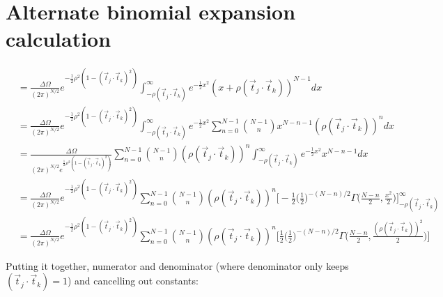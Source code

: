 \documentclass[12pt]{article}
\newcommand{\ptjtk}{\rho(\vec{t}_j\cdot\vec{t}_k)}
\newcommand{\tjtk}{(\vec{t}_j\cdot\vec{t}_k)}
\begin{document}
\section{Alternate binomial expansion calculation}\label{section:alternate_binomial_expansion_calculations}

        \begin{align}
        &= \frac{\Delta\Omega}{(2\pi)^{N/2}} e^{-\frac{1}{2}\rho^2(1-(\vec{t}_j\cdot\vec{t}_k)^2)} \int_{-\ptjtk}^\infty  e^{-\frac{1}{2} x^2  } {(x+\ptjtk)^{N-1}} dx \\
        &= \frac{\Delta\Omega}{(2\pi)^{N/2}} e^{-\frac{1}{2}\rho^2(1-(\vec{t}_j\cdot\vec{t}_k)^2)} \int_{-\ptjtk}^\infty  e^{-\frac{1}{2} x^2  } {\sum_{n=0}^{N-1} \binom{N-1}{n}x^{N-n-1}(\ptjtk)^{n} } dx \\
        &= \frac{\Delta\Omega}{(2\pi)^{N/2}  e^{\frac{1}{2}\rho^2(1-(\vec{t}_j\cdot\vec{t}_k)^2)}}  \sum_{n=0}^{N-1} \binom{N-1}{n} (\ptjtk)^{n} \int_{-\ptjtk}^\infty e^{-\frac{1}{2} x^2  } x^{N-n-1}  dx \\
        &= \frac{\Delta\Omega}{(2\pi)^{N/2}} e^{-\frac{1}{2}\rho^2(1-(\vec{t}_j\cdot\vec{t}_k)^2)}  \sum_{n=0}^{N-1} \binom{N-1}{n} (\ptjtk)^{n} 
          \Big[
            -\frac{1}{2}\Big(\frac{1}{2}\Big)^{-(N-n)/2}\Gamma\Big(\frac{N-n}{2},\frac{x^2}{2}\Big)
          \Big]^{\infty}_{-\ptjtk} \\
        &= \frac{\Delta\Omega}{(2\pi)^{N/2}} e^{-\frac{1}{2}\rho^2(1-(\vec{t}_j\cdot\vec{t}_k)^2)}  \sum_{n=0}^{N-1} \binom{N-1}{n} (\ptjtk)^{n} 
          \Big[
            \frac{1}{2}\Big(\frac{1}{2}\Big)^{-(N-n)/2}\Gamma\Big(\frac{N-n}{2},\frac{(\ptjtk)^2}{2}\Big)
          \Big]
        \end{align}

Putting it together, numerator and denominator (where denominator only keeps $\tjtk=1$) and cancelling out constants:
\end{document}
